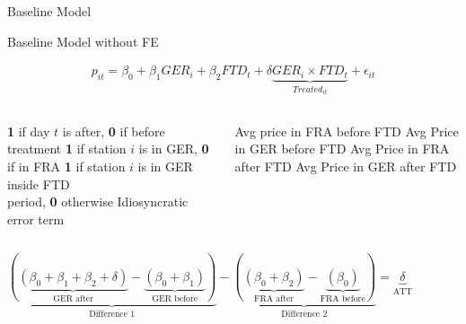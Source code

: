 \begin{frame}{Baseline Model}

\vspace{-0.7cm}

\begin{block}{Baseline Model without FE}

\begin{equation}
\begin{aligned}
\label{eq:Base_DiD1}
p_{it} = \beta_{0} + \beta_{1} GER_{i} + \beta_{2} FTD_{t} + \delta \underbrace{GER_{i} \times FTD_{t}}_{Treated_{it}}  + \epsilon_{it}
\end{aligned}
\end{equation}


\end{block}

\tiny






\begin{columns}
    \begin{column}{0.5\textwidth}
      \begin{outline}
        \1  \textbf{1} if day $t$ is after, \textbf{0} if before treatment
        \1  \textbf{1} if station $i$ is in GER, \textbf{0} if in FRA
        \1  \textbf{1} if station $i$ is in GER inside FTD\\  \makebox[0.9cm][l]{} period, \textbf{0} otherwise
        \1  Idiosyncratic error term
      \end{outline}
    \end{column}
    \begin{column}{0.6\textwidth}
        \begin{outline}
        \1  Avg price in FRA before FTD
        \1  Avg Price in GER before FTD
        \1  Avg Price in FRA after FTD
        \1  Avg Price in GER after FTD
      \end{outline}
    \end{column}
\end{columns}

\vspace{0.3cm}

\centering

$\underbrace{\left(\underbrace{\left(\beta_{0} + \beta_{1} + \beta_{2} + \delta\right)}_{\text{GER after}} - \underbrace{\left(\beta_{0} + \beta_{1}\right)}_{\text{GER before}}\right)}_{\text{Difference 1}} - \underbrace{\left(\underbrace{\left(\beta_{0} + \beta_{2}\right)}_{\text{FRA after}} - \underbrace{\left(\beta_{0}\right)}_{\text{FRA before}}\right)}_{\text{Difference 2}} = \underbrace{\delta}_{\text{ATT}}$



\end{frame}
